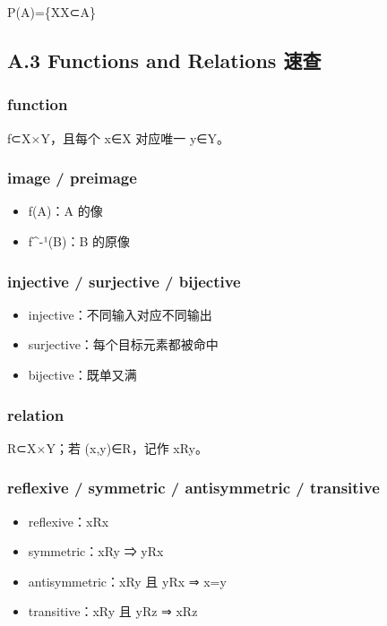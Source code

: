 \documentclass[
  11pt,
]{article}
\providecommand{\tightlist}{%
  \setlength{\itemsep}{0pt}\setlength{\parskip}{0pt}}
\begin{document}
P(A)=\{X\textbar X⊂A\}

\subsection{A.3 Functions and Relations
速查}\label{a.3-functions-and-relations-ux901fux67e5}

\subsubsection{function}\label{function}

f⊂X×Y，且每个 x∈X 对应唯一 y∈Y。

\subsubsection{image / preimage}\label{image-preimage-1}

\begin{itemize}
\tightlist
\item
  f(A)：A 的像
\item
  f\^{}-¹(B)：B 的原像
\end{itemize}

\subsubsection{injective / surjective /
bijective}\label{injective-surjective-bijective-1}

\begin{itemize}
\tightlist
\item
  injective：不同输入对应不同输出
\item
  surjective：每个目标元素都被命中
\item
  bijective：既单又满
\end{itemize}

\subsubsection{relation}\label{relation}

R⊂X×Y；若 (x,y)∈R，记作 xRy。

\subsubsection{reflexive / symmetric / antisymmetric /
transitive}\label{reflexive-symmetric-antisymmetric-transitive}

\begin{itemize}
\tightlist
\item
  reflexive：xRx
\item
  symmetric：xRy ⇒ yRx
\item
  antisymmetric：xRy 且 yRx ⇒ x=y
\item
  transitive：xRy 且 yRz ⇒ xRz
\end{itemize}
\end{document}
